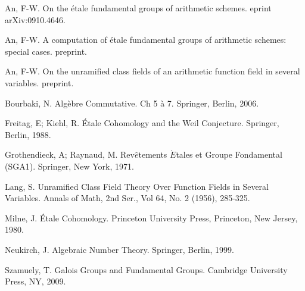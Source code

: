 \documentclass{amsart}
\theoremstyle{definition}
\numberwithin{equation}{section}
\begin{document}
\begin{thebibliography}{99}
 An, F-W. On the \'{e}tale fundamental groups of arithmetic
schemes. eprint arXiv:0910.4646.

 An, F-W. A computation of \'{e}tale fundamental groups of
arithmetic schemes: special cases. preprint.

 An, F-W. On the unramified
class fields of an arithmetic function field in several variables.
preprint.

 Bourbaki, N. Alg\`{e}bre Commutative. Ch 5 \`{a} 7.
Springer, Berlin, 2006.

 Freitag, E; Kiehl, R. \'{E}tale Cohomology and the Weil
Conjecture. Springer, Berlin, 1988.

 Grothendieck, A; Raynaud, M. Rev$\hat{e}$tements $\acute{E}$tales et Groupe Fondamental (SGA1). Springer, New York, 1971.

 Lang, S. Unramified Class Field Theory Over Function
Fields in Several Variables. Annals of Math, 2nd Ser., Vol 64, No. 2
(1956), 285-325.

 Milne, J. \'{E}tale Cohomology. Princeton University Press,
Princeton, New Jersey, 1980.

 Neukirch, J. Algebraic Number Theory. Springer, Berlin, 1999.

 Szamuely, T. Galois Groups and Fundamental Groups. Cambridge
University Press, NY, 2009.
\end{thebibliography}
\end{document}
